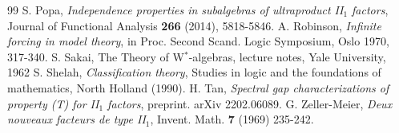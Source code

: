 \documentclass[12pt]{amsart}
\theoremstyle{definition}
\begin{document}
\begin{thebibliography}{99}
 S. Popa, \emph{Independence properties in subalgebras of ultraproduct II$_1$ factors}, Journal of Functional Analysis \textbf{266} (2014), 5818-5846.
 A. Robinson, \emph{Infinite forcing in model theory}, in Proc. Second Scand. Logic Symposium, Oslo 1970, 317-340.
 S. Sakai, The Theory of W$^*$-algebras, lecture notes, Yale University, 1962
 S. Shelah, \emph{Classification theory}, Studies in logic and the foundations of mathematics, North Holland (1990).
 H. Tan, \emph{Spectral gap characterizations of property (T) for II$_1$ factors}, preprint.  arXiv 2202.06089.
 G. Zeller-Meier, \emph{Deux nouveaux facteurs de type II$_1$}, Invent. Math. \textbf{7} (1969) 235-242.
\end{thebibliography}
\end{document}
